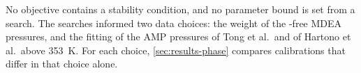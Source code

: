 No objective contains a stability condition, and no parameter bound is set from a search.
The searches informed two data choices: the weight of the \COtwo-free MDEA pressures, and the fitting of the AMP pressures of Tong et al.\ and of Hartono et al.\ above \SI{353}{\kelvin}.
For each choice, \cref{sec:results-phase} compares calibrations that differ in that choice alone.
